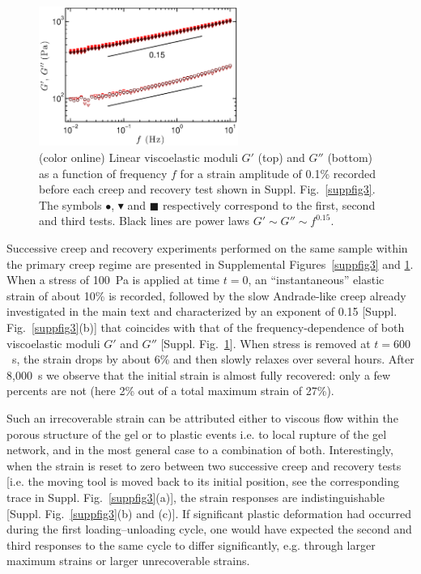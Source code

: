 \documentclass[twocolumn,superscriptaddress,showpacs,preprintnumbers,amsmath,amssymb,prl]{revtex4}
\begin{document}
\begin{figure}
\centering
\includegraphics[width=6.5cm,clip]{SuppFig4.eps}
\caption{(color online) Linear viscoelastic moduli $G'$ (top) and $G''$ (bottom) as a function of frequency $f$ for a strain amplitude of 0.1\% recorded before each creep and recovery test shown in Suppl. Fig.~\ref{suppfig3}. The symbols \textcolor{red!25!black}{$\bullet$}, \textcolor{red!50!black}{$\blacktriangledown$} and \textcolor{red!75!black}{$\blacksquare$} respectively correspond to the first, second and third tests. Black lines are power laws $G'\sim G''\sim f^{0.15}$. 
\label{suppfig4}}
\end{figure} 

Successive creep and recovery experiments performed on the same sample within the primary creep regime are presented in Supplemental Figures~\ref{suppfig3} and \ref{suppfig4}. When a stress of 100~Pa is applied at time $t=0$, an ``instantaneous'' elastic strain of about 10\% is recorded, followed by the slow Andrade-like creep already investigated in the main text and characterized by an exponent of 0.15 [Suppl. Fig.~\ref{suppfig3}(b)] that coincides with that of the frequency-dependence of both viscoelastic moduli $G'$ and $G''$ [Suppl. Fig.~\ref{suppfig4}]. When stress is removed at $t=600$~s, the strain drops by about 6\% and then slowly relaxes over several hours. After 8,000~s we observe that the initial strain is almost fully recovered: only a few percents are not (here 2\% out of a total maximum strain of 27\%).

Such an irrecoverable strain can be attributed either to viscous flow within the porous structure of the gel or to plastic events i.e. to local rupture of the gel network, and in the most general case to a combination of both. Interestingly, when the strain is reset to zero between two successive creep and recovery tests [i.e. the moving tool is moved back to its initial position, see the corresponding trace in Suppl. Fig.~\ref{suppfig3}(a)], the strain responses are indistinguishable [Suppl. Fig.~\ref{suppfig3}(b) and (c)]. If significant plastic deformation had occurred during the first loading--unloading cycle, one would have expected the second and third responses to the same cycle to differ significantly, e.g. through larger maximum strains or larger unrecoverable strains.
\end{document}
